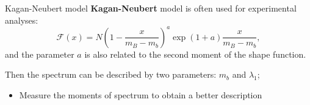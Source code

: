 \documentclass[xcolor=dvipsnames]{beamer}
\begin{document}
   \begin{frame}{Kagan-Neubert model}
      \small
      \textbf{Kagan-Neubert} model is often used for experimental analyses:
      \begin{equation}\nonumber
         \mathcal{F}(x) = N\left(1-\frac{x}{m_B-m_b}\right)^a\exp{(1+a)\frac{x}{m_B-m_b}},
     \end{equation}
     and the parameter $a$ is also related to the second moment of the shape function.

     Then the spectrum can be described by two parameters: $m_b$ and $\lambda_1$;

     \begin{itemize}
      \item[\ra] Measure the moments of \BtoXsgamma spectrum to obtain a better description 
     \end{itemize}

   \end{frame}
\end{document}
